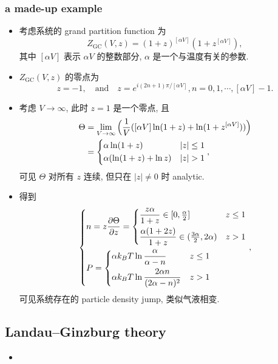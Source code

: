 \subsubsection{a made-up example}
\begin{itemize}
	\item 考虑系统的 grand partition function 为
	\begin{equation}
		Z_\text{GC}(V, z) = (1 + z)^{[\alpha V]} (1 + z^{[\alpha V]}),
	\end{equation}
	其中 $[\alpha V]$ 表示 $\alpha V$ 的整数部分, $\alpha$ 是一个与温度有关的参数.
	
	\item $Z_\text{GC}(V, z)$ 的零点为
	\begin{equation}
		z = - 1, \quad \text{and} \quad z = e^{i (2 n + 1) \pi / [\alpha V]}, n = 0, 1, \cdots, [\alpha V] - 1.
	\end{equation}
	
	\item 考虑 $V \rightarrow \infty$, 此时 $z = 1$ 是一个零点, 且
	\begin{align}
		\Theta &= \lim_{V \rightarrow \infty} \Big( \frac{1}{V} ([\alpha V] \ln(1 + z) + \ln(1 + z^{[\alpha V]})) \Big) \notag \\
		&= \begin{dcases}
			\alpha \ln(1 + z) & |z| \leq 1 \\
			\alpha (\ln(1 + z) + \ln z) & |z| > 1
		\end{dcases},
	\end{align}
	可见 $\Theta$ 对所有 $z$ 连续, 但只在 $|z| \neq 0$ 时 analytic.
	
	\item 得到
	\begin{equation}
		\begin{dcases}
			n = z \frac{\partial \Theta}{\partial z} = \begin{dcases}
				\frac{z \alpha}{1 + z} \in [0, {\textstyle \frac{\alpha}{2}}] & z \leq 1 \\
				\frac{\alpha (1 + 2 z)}{1 + z} \in ({\textstyle \frac{3 \alpha}{2}}, 2 \alpha) & z > 1
			\end{dcases} \\
			P = \begin{dcases}
				\alpha k_B T \ln \frac{\alpha}{\alpha - n} & z \leq 1 \\
				\alpha k_B T \ln \frac{2 \alpha n}{(2 \alpha - n)^2} & z > 1
			\end{dcases}
		\end{dcases},
	\end{equation}
	可见系统存在的 particle density jump, 类似气液相变.
\end{itemize}

\subsection{Landau--Ginzburg theory}
\begin{itemize}
	\item 
\end{itemize}